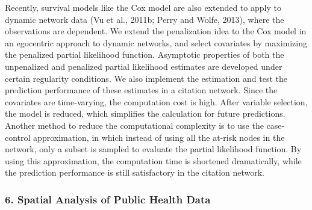 \begin{itemize}
Recently, survival models like the Cox model are also extended to apply to dynamic network data (Vu et al., 2011b; Perry and Wolfe, 2013), where the observations are dependent. We extend the penalization idea to the Cox model in an egocentric approach to dynamic networks, and select covariates by maximizing the penalized partial likelihood function. Asymptotic properties of both the unpenalized and penalized partial likelihood estimates are developed under certain regularity conditions. We also implement the estimation and test the prediction performance of these estimates in a citation network. Since the covariates are time-varying, the computation cost is high. After variable selection, the model is reduced, which simplifies the calculation for future predictions. Another method to reduce the computational complexity is to use the case-control approximation, in which instead of using all the at-risk nodes in the network, only a subset is sampled to evaluate the partial likelihood function. By using this approximation, the computation time is shortened dramatically, while the prediction performance is still satisfactory in the citation network.

\end{itemize}

\subsubsection*{6. Spatial Analysis of Public Health Data}

